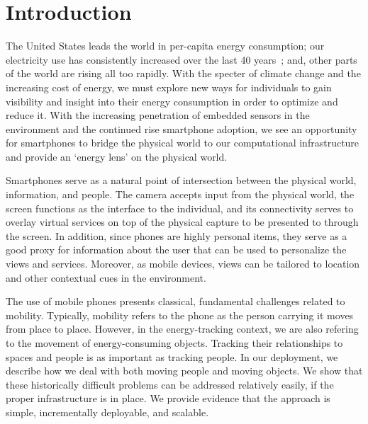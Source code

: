\section{Introduction}
The United States leads the world in per-capita energy consumption; 
our electricity use has consistently increased over the last 40 years~\cite{oecd2011}; and, other parts of the world are rising all too rapidly.
With the specter of climate change and the increasing cost of energy, we must explore new
ways for individuals to gain visibility and insight into their energy consumption in order to optimize and reduce it. 
With the increasing penetration of embedded sensors in the environment and
the continued rise smartphone adoption, we see an opportunity for smartphones to bridge the physical world
to our computational infrastructure and provide an `energy lens' on the physical world.  

Smartphones serve as a natural point of intersection between the physical world, information, and people.  The camera
accepts input from the physical world, the screen functions as the
interface to the individual, and its connectivity serves to overlay virtual services on top of the physical capture to be presented
to through the screen.  
In addition, since phones are highly personal items, they serve as a good proxy for information about the user
that can be used to personalize the views and services.  Moreover, as mobile devices, views can be tailored to location and other 
contextual cues in the environment.


The use of mobile phones presents classical, fundamental challenges related to mobility.  Typically, mobility
refers to the phone as the person carrying it moves from place to place.  However, in the energy-tracking
context, we are also refering to the movement of energy-consuming objects.  Tracking their relationships to spaces and people is as important as tracking people.
In our deployment, we describe how we deal with both moving people and moving objects.  We show that these historically difficult
problems can be addressed relatively easily, if the proper infrastructure is in place.  We provide evidence that the approach is simple, incrementally deployable, and scalable.

